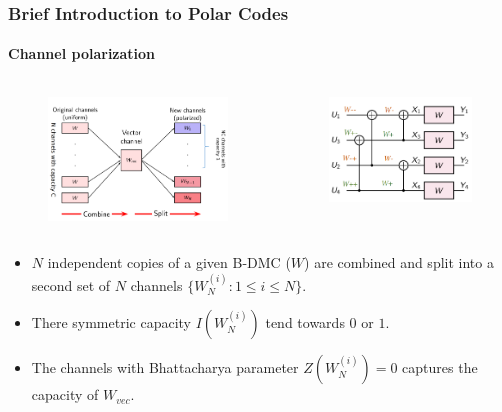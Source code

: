 \documentclass[xcolor=dvipsnames]{beamer}
\begin{document}
\begin{frame}[label = polarcodes]
\frametitle{Brief Introduction to Polar Codes}
\framesubtitle{Channel polarization}
\begin{minipage}[0.9\textheight]{\textwidth}
\begin{columns}
\begin{column}{0.5\textwidth}
\begin{figure}
\centering
\includegraphics[width=5cm]{./channelcombp.png}
\end{figure}
\end{column}
\begin{column}{0.5\textwidth}
\begin{figure}
\centering
\includegraphics[width=4cm]{./arikanflyp4.png}
\end{figure}
\end{column}
\end{columns}
\end{minipage}
\begin{itemize}
\item $N$ independent copies of a given B-DMC ($W$) are combined and split into a second set of $N$ channels $\{W^{(i)}_N : 1 \leq i \leq N \}$.
\item There symmetric capacity $I(W^{(i)}_N )$ tend towards $0$ or $1$.
\item The channels with Bhattacharya parameter $Z(W^{(i)}_N)=0$ captures the capacity of $W_{vec}$.
\end{itemize}
\end{frame}
\end{document}
